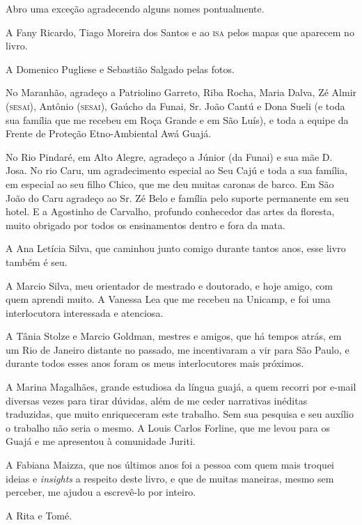Abro uma exceção agradecendo alguns nomes pontualmente.

A Fany Ricardo, Tiago Moreira dos Santos e ao \textsc{isa} pelos mapas que
aparecem no livro.

A Domenico Pugliese e Sebastião Salgado pelas fotos.

No Maranhão, agradeço a Patriolino Garreto, Riba Rocha, Maria Dalva, Zé
Almir (\textsc{sesai}), Antônio (\textsc{sesai}), Gaúcho da Funai, Sr. João Cantú e Dona
Sueli (e toda sua família que me recebeu em Roça Grande e em São Luís),
e toda a equipe da Frente de Proteção Etno-Ambiental Awá Guajá.

No Rio Pindaré, em Alto Alegre, agradeço a Júnior (da Funai) e sua mãe
D. Josa. No rio Caru, um agradecimento especial ao Seu Cajú e toda a sua
família, em especial ao seu filho Chico, que me deu muitas caronas de
barco. Em São João do Caru agradeço ao Sr. Zé Belo e família pelo
suporte permanente em seu hotel. E a Agostinho de Carvalho, profundo
conhecedor das artes da floresta, muito obrigado por todos os
ensinamentos dentro e fora da mata.

A Ana Letícia Silva, que caminhou junto comigo durante tantos anos, esse
livro também é seu.

A Marcio Silva, meu orientador de mestrado e doutorado, e hoje amigo,
com quem aprendi muito. A Vanessa Lea que me recebeu na Unicamp, e foi
uma interlocutora interessada e atenciosa.

A Tânia Stolze e Marcio Goldman, mestres e amigos, que há tempos atrás,
em um Rio de Janeiro distante no passado, me incentivaram a vir para São
Paulo, e durante todos esses anos foram os meus interlocutores mais
próximos.

A Marina Magalhães, grande estudiosa da língua guajá, a quem recorri por
e-mail diversas vezes para tirar dúvidas, além de me ceder narrativas
inéditas traduzidas, que muito enriqueceram este trabalho. Sem sua
pesquisa e seu auxílio o trabalho não seria o mesmo. A Louis Carlos
Forline, que me levou para os Guajá e me apresentou à comunidade Juriti.

A Fabiana Maizza, que nos últimos anos foi a pessoa com quem mais
troquei ideias e \textit{insights} a respeito deste livro, e que de muitas
maneiras, mesmo sem perceber, me ajudou a escrevê-lo por inteiro.

A Rita e Tomé.

